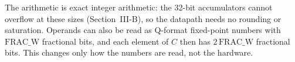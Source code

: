 The arithmetic is exact integer arithmetic: the 32-bit accumulators cannot overflow at these sizes (Section~III-B), so the datapath needs no rounding or saturation. Operands can also be read as Q-format fixed-point numbers with $\mathrm{FRAC\_W}$ fractional bits, and each element of $C$ then has $2\,\mathrm{FRAC\_W}$ fractional bits. This changes only how the numbers are read, not the hardware.
